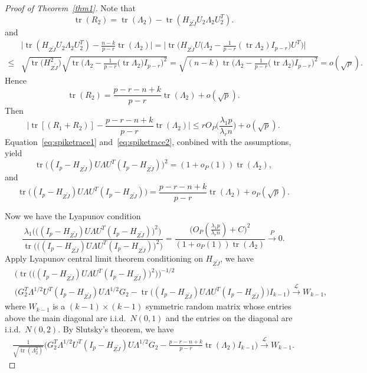\documentclass[review]{elsarticle}
\DeclareMathOperator{\mytr}{tr}
\theoremstyle{plain}
\theoremstyle{definition}
\theoremstyle{remark}
\begin{document}
\begin{proof}[\textrm{Proof of Theorem~\ref{thm1}}]
Note that
    $$
    \mytr(R_2)
    =
    \mytr(\Lambda_2)-\mytr(H_{Z\tilde{J}}U_2\Lambda_2 U_2^T).
    $$ 
and
    $$
    \begin{aligned}
        &
        \big|
    \mytr(H_{Z\tilde{J}}U_2\Lambda_2 U_2^T)
    -\frac{n-k}{p-r}\mytr(\Lambda_2)
    \big|
    =
    \big|
        \mytr\Big(H_{Z\tilde{J}} U \big(\Lambda_2-\frac{1}{p-r} (\mytr \Lambda_2) I_{p-r} \big) U^T\Big)
    \big|
        \\
        \leq &
        \sqrt{\mytr \big(H_{Z\tilde{J}}^2\big)}
        \sqrt{\mytr \Big(\Lambda_2-\frac{1}{p-r}\big(\mytr \Lambda_2\big) I_{p-r}\Big)^2}
        =\sqrt{(n-k)\mytr \Big(\Lambda_2-\frac{1}{p-r}\big(\mytr \Lambda_2\big) I_{p-r}\Big)^2}
        =o(\sqrt{p}).
    \end{aligned}
    $$
    Hence 
    $$
    \mytr(R_2)
    =
    \frac{p-r-n+k}{p-r}\mytr(\Lambda_2)+o(\sqrt{p}).
    $$
    Then
\begin{equation}\label{eq:spiketrace2}
\big| \mytr [(R_1+R_2)]-\frac{p-r-n+k}{p-r}\mytr(\Lambda_2)\big|\leq 
rO_P\big(\frac{\lambda_1 p}{\lambda_r n}\big)+o(\sqrt{p}).
\end{equation}
Equation~\eqref{eq:spiketrace1} and~\eqref{eq:spiketrace2}, conbined with the assumptions, yield
$$
    \mytr\big((I_p-H_{Z\tilde{J}})U\Lambda U^T (I_p-H_{Z\tilde{J}})\big)^2 
 =(1+o_P(1))\mytr(\Lambda_2),
$$
and
$$
\mytr\big((I_p-H_{Z\tilde{J}})U\Lambda U^T (I_p-H_{Z\tilde{J}})\big)
= \frac{p-r-n+k}{p-r}\mytr(\Lambda_2)+o_P(\sqrt{p}).
$$

Now we have the Lyapunov condition
$$
\frac{\lambda_1\Big(\big((I_p-H_{Z\tilde{J}})U\Lambda U^T (I_p-H_{Z\tilde{J}})\big)^2\Big)}{\mytr \Big( \big((I_p-H_{Z\tilde{J}})U\Lambda U^T (I_p-H_{Z\tilde{J}})\big)^2\Big)}
=
\frac{
\big( O_P(\frac{\lambda_1 p}{\lambda_r n})+C\big)^2
}{
    (1+o_P(1))\mytr(\Lambda_2)
}
\xrightarrow{P} 0.
$$
Apply Lyapunov central limit theorem conditioning on $H_{Z\tilde{J}}$, we have
$$
\begin{aligned}
    &\Big(\mytr \Big( \big((I_p-H_{Z\tilde{J}})U\Lambda U^T (I_p-H_{Z\tilde{J}})\big)^2\Big) \Big)^{-1/2}\\
    &\big( G_2^T \Lambda^{1/2}U^T (I_p-H_{Z\tilde{J}})U\Lambda^{1/2}G_2
    -\mytr\big((I_p-H_{Z\tilde{J}})U\Lambda U^T (I_p-H_{Z\tilde{J}})\big)
     I_{k-1} \big)
\xrightarrow{\mathcal{L}} W_{k-1},
\end{aligned}
$$
where $W_{k-1}$ is a $(k-1)\times(k-1)$ symmetric random matrix whose entries above the main diagonal are i.i.d.\ $N(0,1)$ and the entries on the diagonal are i.i.d.\ $N(0,2)$.
By Slutsky's theorem, we have
$$
\begin{aligned}
    \frac{1}{\sqrt{\mytr(\Lambda_2^2)}}
    \big( G_2^T \Lambda^{1/2}U^T (I_p-H_{Z\tilde{J}})U\Lambda^{1/2}G_2
    -\tfrac{p-r-n+k}{p-r}\mytr(\Lambda_2)I_{k-1} \big)
\xrightarrow{\mathcal{L}} W_{k-1}.
\end{aligned}
$$




\end{proof}
\end{document}
